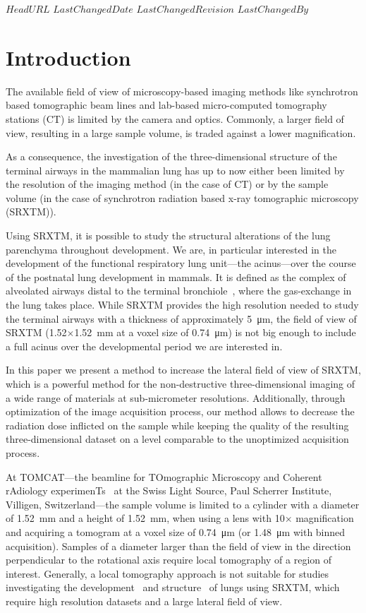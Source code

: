 \svnidlong
{$HeadURL$}
{$LastChangedDate$}
{$LastChangedRevision$}
{$LastChangedBy$}
%
\section{Introduction}

The available field of view of microscopy-based imaging methods like synchrotron based tomographic beam lines and lab-based micro-computed tomography stations (\micro CT) is limited by the camera and optics. Commonly, a larger field of view, resulting in a large sample volume, is traded against a lower magnification. 

As a consequence, the investigation of the three-dimensional structure of the terminal airways in the mammalian lung has up to now either been limited by the resolution of the imaging method (in the case of \micro CT) or by the sample volume (in the case of synchrotron radiation based x-ray tomographic microscopy (SRXTM)). 

Using SRXTM, it is possible to study the structural alterations of the lung parenchyma throughout development. We are, in particular interested in the development of the functional respiratory lung unit---the acinus---over the course of the postnatal lung development in mammals. It is defined as the complex of alveolated airways distal to the terminal bronchiole~\cite{Rodriguez1987}, where the gas-exchange in the lung takes place. While SRXTM provides the high resolution needed to study the terminal airways with a thickness of approximately \SI{5}{\micro\meter}, the field of view of SRXTM (1.52$\times$\SI{1.52}{\milli\meter} at a voxel size of \SI{0.74}{\micro\meter}) is not big enough to include a full acinus over the developmental period we are interested in.

In this paper we present a method to increase the lateral field of view of SRXTM, which is a powerful method for the non-destructive three-dimensional imaging of a wide range of materials at sub-micrometer resolutions. Additionally, through optimization of the image acquisition process, our method allows to decrease the radiation dose inflicted on the sample while keeping the quality of the resulting three-dimensional dataset on a level comparable to the unoptimized acquisition process.

At TOMCAT---the beamline for TOmographic Microscopy and Coherent rAdiology experimenTs~\cite{Stampanoni2007} at the Swiss Light Source, Paul Scherrer Institute, Villigen, Switzerland---the sample volume is limited to a cylinder with a diameter of \SI{1.52}{\milli\meter} and a height of \SI{1.52}{\milli\meter}, when using a lens with 10$\times$ magnification and acquiring a tomogram at a voxel size of \SI{0.74}{\micro\meter} (or \SI{1.48}{\micro\meter} with binned acquisition). Samples of a diameter larger than the field of view in the direction perpendicular to the rotational axis require local tomography of a region of interest. Generally, a local tomography approach is not suitable for studies investigating the development~\cite{Schittny2008,Mund2008,Haberthuer2009c} and structure~\cite{Tsuda2008} of lungs using SRXTM, which require high resolution datasets and a large lateral field of view.

